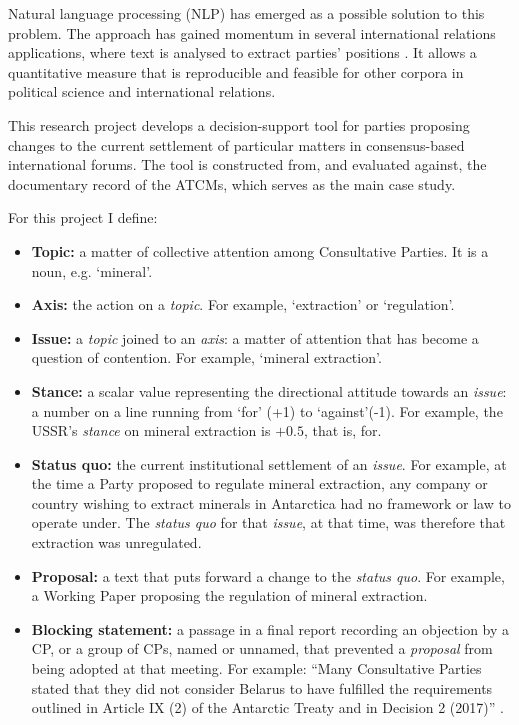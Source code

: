 Natural language processing (NLP) has emerged as a possible solution to this problem. The
approach has gained momentum in several international relations applications, where text is
analysed to extract parties' positions \parencite{Grimmer2013,Slapin2008,Baturo2017,Rheault2019}.
It allows a quantitative measure that is reproducible and feasible for other corpora in
political science and international relations.

This research project develops a decision-support tool for parties proposing changes to the
current settlement of particular matters in consensus-based international forums. The tool is constructed
from, and evaluated against, the documentary record of the ATCMs, which serves as the main case
study.

For this project I define:
\begin{itemize}[nosep]
  \item \textbf{Topic:} a matter of collective attention among Consultative Parties. It is a
  noun, e.g. `mineral'.
  \item \textbf{Axis:} the action on a \textit{topic}. For example, `extraction' or `regulation'.
  \item \textbf{Issue:} a \textit{topic} joined to an \textit{axis}: a matter of attention that
  has become a question of contention. For example, `mineral extraction'.
  \item \textbf{Stance:} a scalar value representing the directional attitude towards an
  \textit{issue}: a number on a line running from `for' (+1) to `against'(-1). For example, the USSR's
  \textit{stance} on mineral extraction is $+0.5$, that is, for.
  \item \textbf{Status quo:} the current institutional settlement of an \textit{issue}. For
  example, at the time a Party proposed to regulate mineral extraction, any company or country
  wishing to extract minerals in Antarctica had no framework or law to operate under. The
  \textit{status quo} for that \textit{issue}, at that time, was therefore that extraction was
  unregulated.
  \item \textbf{Proposal:} a text that puts forward a change to the \textit{status quo}. For
  example, a Working Paper proposing the regulation of mineral extraction.
  \item \textbf{Blocking statement:} a passage in a final report recording an objection by a CP,
  or a group of CPs, named or unnamed, that prevented a \textit{proposal} from being adopted at
  that meeting. For example: ``Many Consultative Parties stated that they did not consider
  Belarus to have fulfilled the requirements outlined in Article IX (2) of the Antarctic Treaty
  and in Decision 2 (2017)'' \parencite[para.~186]{ATCM47FinalReport}.
\end{itemize}


